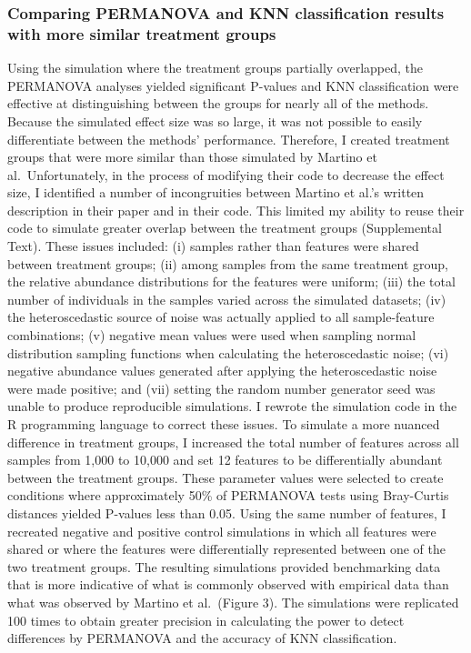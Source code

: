 \documentclass[
  11pt,
]{article}
\begin{document}
\subsubsection{Comparing PERMANOVA and KNN classification results with
more similar treatment
groups}\label{comparing-permanova-and-knn-classification-results-with-more-similar-treatment-groups}

Using the simulation where the treatment groups partially overlapped,
the PERMANOVA analyses yielded significant P-values and KNN
classification were effective at distinguishing between the groups for
nearly all of the methods. Because the simulated effect size was so
large, it was not possible to easily differentiate between the methods'
performance. Therefore, I created treatment groups that were more
similar than those simulated by Martino et al.~Unfortunately, in the
process of modifying their code to decrease the effect size, I
identified a number of incongruities between Martino et al.'s written
description in their paper and in their code. This limited my ability to
reuse their code to simulate greater overlap between the treatment
groups (Supplemental Text). These issues included: (i) samples rather
than features were shared between treatment groups; (ii) among samples
from the same treatment group, the relative abundance distributions for
the features were uniform; (iii) the total number of individuals in the
samples varied across the simulated datasets; (iv) the heteroscedastic
source of noise was actually applied to all sample-feature combinations;
(v) negative mean values were used when sampling normal distribution
sampling functions when calculating the heteroscedastic noise; (vi)
negative abundance values generated after applying the heteroscedastic
noise were made positive; and (vii) setting the random number generator
seed was unable to produce reproducible simulations. I rewrote the
simulation code in the R programming language to correct these issues.
To simulate a more nuanced difference in treatment groups, I increased
the total number of features across all samples from 1,000 to 10,000 and
set 12 features to be differentially abundant between the treatment
groups. These parameter values were selected to create conditions where
approximately 50\% of PERMANOVA tests using Bray-Curtis distances
yielded P-values less than 0.05. Using the same number of features, I
recreated negative and positive control simulations in which all
features were shared or where the features were differentially
represented between one of the two treatment groups. The resulting
simulations provided benchmarking data that is more indicative of what
is commonly observed with empirical data than what was observed by
Martino et al.~(Figure 3). The simulations were replicated 100 times to
obtain greater precision in calculating the power to detect differences
by PERMANOVA and the accuracy of KNN classification.
\end{document}
